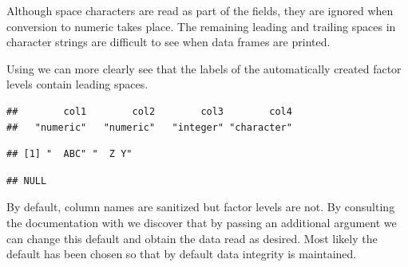 \documentclass[krantz2]{krantz}\usepackage{knitr}
\begin{document}
Although space characters are read as part of the fields, they are ignored when conversion to numeric takes place. The remaining leading and trailing spaces in character strings are difficult to see when data frames are printed.
\begin{knitrout}\footnotesize
{}\color{fgcolor}\begin{kframe}
\begin{alltt}
 \hlkwb{<-} \hlstd{(}\hlstd{)}
\end{alltt}
\end{kframe}
\end{knitrout}

Using  we can more clearly see that the labels of the automatically created factor levels contain leading spaces.
\begin{knitrout}\footnotesize
{}\color{fgcolor}\begin{kframe}
\begin{alltt}
\end{alltt}
\begin{verbatim}
##        col1        col2        col3        col4
##   "numeric"   "numeric"   "integer" "character"
\end{verbatim}
\begin{alltt}
\hlstd{from_csv_b.df[[}\hlstd{]]}
\end{alltt}
\begin{verbatim}
## [1] "  ABC" "  Z Y"
\end{verbatim}
\begin{alltt}
\hlstd{(from_csv_b.df[[}\hlstd{]])}
\end{alltt}
\begin{verbatim}
## NULL
\end{verbatim}
\end{kframe}
\end{knitrout}

By default, column names are sanitized but factor levels are not. By consulting the documentation with  we discover that by passing an additional argument we can change this default and obtain the data read as desired. Most likely the default has been chosen so that by default data integrity is maintained.
\end{document}
